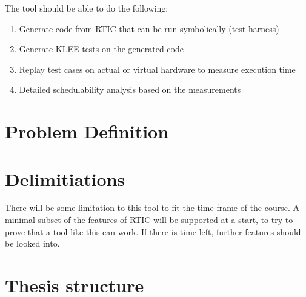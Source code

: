The tool should be able to do the following:
%
\begin{enumerate}
    \item Generate code from RTIC that can be run symbolically (test harness)
    \item Generate KLEE tests on the generated code
    \item Replay test cases on actual or virtual hardware to measure execution time
    \item Detailed schedulability analysis based on the measurements
\end{enumerate}

\section{Problem Definition}


\section{Delimitiations}
There will be some limitation to this tool to fit the time frame of the course.
A minimal subset of the features of RTIC will be supported at a start, to try
to prove that a tool like this can work. If there is time left, further
features should be looked into.

\section{Thesis structure}
